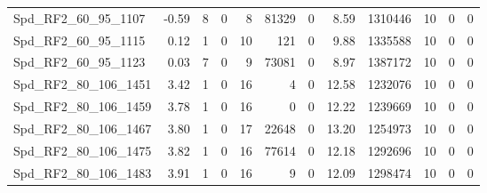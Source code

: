 \begin{longtable}[c]{@{}lrrrrrrrrrrr@{}}
Spd\_RF2\_60\_95\_1107        & -0.59                  & 8                       & 0                       & 8                      & 81329                   & 0                       & 8.59                    & 1310446                  & 10                       & 0                        & 0                        \\
Spd\_RF2\_60\_95\_1115        & 0.12                   & 1                       & 0                       & 10                     & 121                     & 0                       & 9.88                    & 1335588                  & 10                       & 0                        & 0                        \\
Spd\_RF2\_60\_95\_1123        & 0.03                   & 7                       & 0                       & 9                      & 73081                   & 0                       & 8.97                    & 1387172                  & 10                       & 0                        & 0                        \\
Spd\_RF2\_80\_106\_1451       & 3.42                   & 1                       & 0                       & 16                     & 4                       & 0                       & 12.58                   & 1232076                  & 10                       & 0                        & 0                        \\
Spd\_RF2\_80\_106\_1459       & 3.78                   & 1                       & 0                       & 16                     & 0                       & 0                       & 12.22                   & 1239669                  & 10                       & 0                        & 0                        \\
Spd\_RF2\_80\_106\_1467       & 3.80                   & 1                       & 0                       & 17                     & 22648                   & 0                       & 13.20                   & 1254973                  & 10                       & 0                        & 0                        \\
Spd\_RF2\_80\_106\_1475       & 3.82                   & 1                       & 0                       & 16                     & 77614                   & 0                       & 12.18                   & 1292696                  & 10                       & 0                        & 0                        \\
Spd\_RF2\_80\_106\_1483       & 3.91                   & 1                       & 0                       & 16                     & 9                       & 0                       & 12.09                   & 1298474                  & 10                       & 0                        & 0                        \\

\end{longtable}
